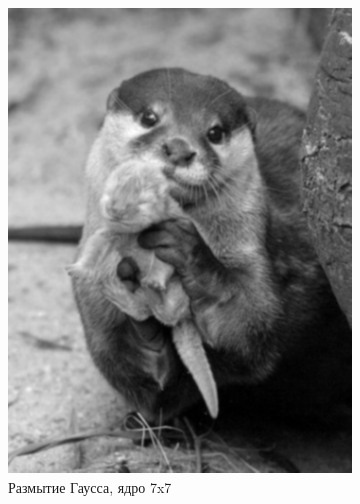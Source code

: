 \begin{figure}[ht!]
    \begin{subfigure}[b]{0.5\linewidth}
        \centering
        \includegraphics[width=0.95\linewidth]{gaussian_7.png}
        \caption{Размытие Гаусса, ядро 7x7}
    \end{subfigure}%
    \begin{subfigure}[b]{0.5\linewidth}
        \centering

\end{subfigure}
\end{figure}
